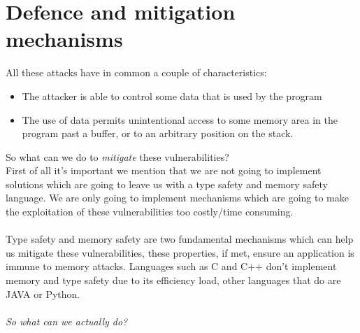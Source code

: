 \documentclass[11pt, oneside]{article}   	%
\begin{document}
\section*{Defence and mitigation mechanisms}
All these attacks have in common a couple of characteristics:\begin{itemize}
\item The attacker is able to control some data that is used by the program
\item The use of data permits unintentional access to some memory area in the program past a buffer, or to an arbitrary position on the stack.
\end{itemize}
So what can we do to \emph{mitigate} these vulnerabilities?\\
First of all it's important we mention that we are not going to implement solutions which are going to leave us with a type safety and memory safety language. We are only going to implement mechanisms which are going to make the exploitation of these vulnerabilities too costly/time consuming.\\\\
Type safety and memory safety are two fundamental mechanisms which can help us mitigate these vulnerabilities, these properties, if met, ensure an application is immune to memory attacks. Languages such as C and C++ don't implement memory and type safety due to its efficiency load, other languages that do are JAVA or Python.\\\\
\emph{So what can we actually do?}
\end{document}
